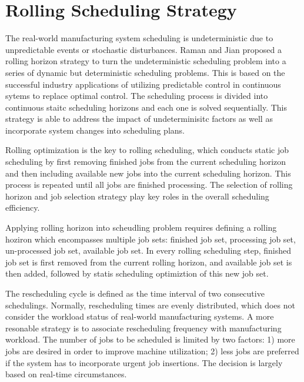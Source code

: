 \section{Rolling Scheduling Strategy}
The real-world manufacturing system scheduling is undeterministic due to unpredictable events or stochastic disturbances.
Raman and Jian proposed a rolling horizon strategy to turn the undeterministic scheduling problem into a series of dynamic but deterministic scheduling problems.
This is based on the successful industry applications of utilizing predictable control in continuous sytems to replace optimal control.
The scheduling process is divided into continuous staitc scheduling horizons and each one is solved sequentially.
This strategy is able to address the impact of undeterminisitc factors as well as incorporate system changes into scheduling plans.

Rolling optimization is the key to rolling scheduling, which conducts static job scheduling by first removing finished jobs from the current scheduling horizon and then including available new jobs into the current scheduling horizon.
This process is repeated until all jobs are finished processing.
The selection of rolling horizon and job selection strategy play key roles in the overall scheduling efficiency.

Applying rolling horizon into scheudling problem requires defining a rolling hoziron which encompasses multiple job sets: finished job set, processing job set, un-processed job set, available job set.
In every rolling scheduling step, finished job set is first removed from the current rolling horizon, and available job set is then added, followed by statis scheduling optimiztion of this new job set.

The rescheduling cycle is defined as the time interval of two consecutive schedulings.
Normally, rescheduling times are evenly distributed, which does not consider the workload status of real-world manufacturing systems.
A more resonable strategy is to associate rescheduling frequency with manufacturing workload.
The number of jobs to be scheduled is limited by two factors: 1) more jobs are desired in order to improve machine utilization; 2) less jobs are preferred if the system has to incorporate urgent job insertions.
The decision is largely based on real-time circumstances.

